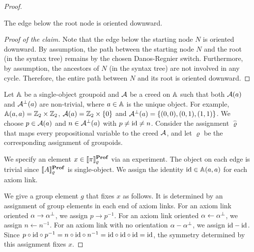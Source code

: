 \begin{proof}

    \begin{claim*}
        The edge below the root node is oriented downward.
    \end{claim*}
    \begin{proof}[Proof of the claim]\renewcommand{\qedsymbol}{$\blacksquare$}
        Note that the edge below the starting node \( N \) is oriented downward.
        By assumption, the path between the starting node \( N \) and the root (in the syntax tree) remains by the chosen Danos-Regnier switch.
        Furthermore, by assumption, the ancestors of \( N \) (in the syntax tree) are not involved in any cycle.
        Therefore, the entire path between \( N \) and its root is oriented downward.
    \end{proof}
    
    Let \( \mathbb{A} \) be a single-object groupoid and \( \mathcal{A} \) be a creed on \( \mathbb{A} \) such that both \( \mathcal{A}(a) \) and \( \mathcal{A}^{\bot}(a) \) are non-trivial, where \( a \in \mathbb{A} \) is the unique object.
    For example, \( \mathbb{A}(a,a) = \mathbb{Z}_2 \times \mathbb{Z}_2 \), \( \mathcal{A}(a) = \mathbb{Z}_2 \times \{ 0 \} \) and \( \mathcal{A}^\bot(a) = \{ (0,0), (0,1), (1,1) \} \).
    We choose \( p \in \mathcal{A}(a) \) and \( n \in \mathcal{A}^{\bot}(a) \) with \( p \neq \mathrm{id} \neq n \).
    Consider the assignment \( \hat{\varrho} \) that maps every propositional variable to the creed \( \mathcal{A} \), and let \( \varrho \) be the corresponding assignment of groupoids.

    We specify an element \( x \in \llbracket{\pi}\rrbracket^{\mathbf{Prof}}_{\varrho} \) via an experiment.
    The object on each edge is trivial since \( \llbracket{A}\rrbracket^{\mathbf{Prof}}_{\varrho} \) is single-object. 
    We assign the identity \( \mathrm{id} \in \mathbb{A}(a,a) \) for each axiom link.

    We give a group element \( g \) that fixes \( x \) as follows.
    It is determined by an assignment of group elements in each end of axiom links.
    For an axiom link oriented \( \alpha \to \alpha^{\bot} \), we assign \( p \to p^{-1} \).
    For an axiom link oriented \( \alpha \leftarrow \alpha^{\bot} \), we assign \( n \leftarrow n^{-1} \).
    For an axiom link with no orientation \( \alpha - \alpha^{\bot} \), we assign \( \mathrm{id} - \mathrm{id} \).
    Since \( p \circ \mathrm{id} \circ p^{-1} = n \circ \mathrm{id} \circ n^{-1} = \mathrm{id} \circ \mathrm{id} \circ \mathrm{id} = \mathrm{id} \), the symmetry determined by this assignment fixes \( x \).


\end{proof}

